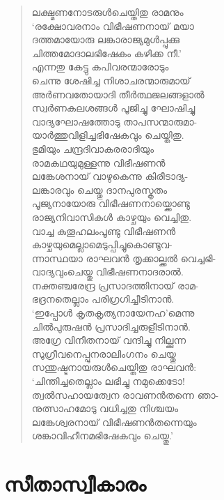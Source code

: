 \begin{verse}
ലക്ഷ്മണനോടരുള്‍ചെയ്തിതു രാമനും\\
‘രക്ഷോവരനാം വിഭീഷണനായ് മയാ\\
ദത്തമായോരു ലങ്കാരാജ്യമുള്‍പ്പുക്കു\\
ചിത്തമോദാലഭിഷേകം കഴിക്ക നീ.’\\
എന്നതു കേട്ടു കപിവരന്മാരോടും\\
ചെന്നു ശേഷിച്ച നിശാചരന്മാരുമായ്\\
അര്‍ണവതോയാദി തീര്‍ത്ഥജലങ്ങളാല്‍\\
സ്വര്‍ണകലശങ്ങള്‍ പൂജിച്ചു ഘോഷിച്ചു\\
വാദ്യഘോഷത്തോടു താപസന്മാരുമാ-\\
യാര്‍ത്തുവിളിച്ചഭിഷേകവും ചെയ്തിതു.\\
ഭുമിയും ചന്ദ്രദിവാകരരാദിയും\\
രാമകഥയുമുള്ളന്നു വിഭീഷണന്‍\\
ലങ്കേശനായ് വാഴുകെന്നു കിരീടാദ്യ-\\
ലങ്കാരവും ചെയ്തു ദാനപുരസ്കൃതം\\
പൂജ്യനായോരു വിഭീഷണനായ്ക്കൊണ്ടു\\
രാജ്യനിവാസികള്‍ കാഴ്ചയും വെച്ചിതു.\\
വാച്ച കുതൂഹലംപൂണ്ടു വിഭീഷണന്‍\\
കാഴ്ചയുമെല്ലാമെടുപ്പിച്ചുകൊണ്ടുവ-\\
ന്നാസ്ഥയാ രാഘവന്‍ തൃക്കാല്ക്കല്‍ വെച്ചഭി-\\
വാദ്യവുംചെയ്തു വിഭീഷണനാദരാല്‍.\\
നക്തഞ്ചരേന്ദ്ര പ്രസാദത്തിനായ് രാമ-\\
ഭദ്രനതെല്ലാം പരിഗ്രഗിച്ചീടിനാന്‍.\\
‘ഇപ്പോള്‍ കൃതകൃത്യനായേനഹ’മെന്നു\\
ചില്‍പുരുഷന്‍ പ്രസാദിച്ചരുളീടിനാന്‍.\\
അഗ്രേ വിനീതനായ് വന്ദിച്ചു നില്ക്കുന്ന\\
സുഗ്രീവനെപ്പുനരാലിംഗനം ചെയ്തു\\
സന്തുഷ്ടനായരുള്‍ചെയ്തിതു രാഘവന്‍:\\
‘ചിന്തിച്ചതെല്ലാം ലഭിച്ചു നമുക്കെടോ!\\
ത്വല്‍സഹായത്വേന രാവണന്‍തന്നെ ഞാ-\\
നുത്സാഹമോടു വധിച്ചതു നിശ്ചയം\\
ലങ്കേശ്വരനായ് വിഭീഷണന്‍തന്നെയും\\
ശങ്കാവിഹീനമഭിഷേകവും ചെയ്തു.’
\end{verse}


\section{സീതാസ്വീകാരം}

